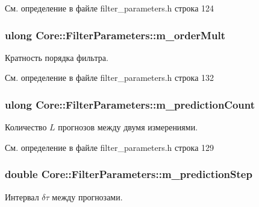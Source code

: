 См. определение в файле filter\+\_\+parameters.\+h строка 124

\subsubsection[{\texorpdfstring{m\+\_\+order\+Mult}{m_orderMult}}]{\setlength{\rightskip}{0pt plus 5cm}ulong Core\+::\+Filter\+Parameters\+::m\+\_\+order\+Mult\hspace{0.3cm}{\ttfamily [private]}}\hypertarget{class_core_1_1_filter_parameters_abbf3de6b71f358870d750c829d1ef4ea}{}\label{class_core_1_1_filter_parameters_abbf3de6b71f358870d750c829d1ef4ea}
Кратность порядка фильтра. 

См. определение в файле filter\+\_\+parameters.\+h строка 132

\subsubsection[{\texorpdfstring{m\+\_\+prediction\+Count}{m_predictionCount}}]{\setlength{\rightskip}{0pt plus 5cm}ulong Core\+::\+Filter\+Parameters\+::m\+\_\+prediction\+Count\hspace{0.3cm}{\ttfamily [private]}}\hypertarget{class_core_1_1_filter_parameters_a6b692ee25b7554649a81c073c009855a}{}\label{class_core_1_1_filter_parameters_a6b692ee25b7554649a81c073c009855a}
Количество $L$ прогнозов между двумя измерениями. 

См. определение в файле filter\+\_\+parameters.\+h строка 129

\subsubsection[{\texorpdfstring{m\+\_\+prediction\+Step}{m_predictionStep}}]{\setlength{\rightskip}{0pt plus 5cm}double Core\+::\+Filter\+Parameters\+::m\+\_\+prediction\+Step\hspace{0.3cm}{\ttfamily [private]}}\hypertarget{class_core_1_1_filter_parameters_a1d15be069d981b8f7e1252cb0fd8970d}{}\label{class_core_1_1_filter_parameters_a1d15be069d981b8f7e1252cb0fd8970d}
Интервал $\delta \tau$ между прогнозами. 

